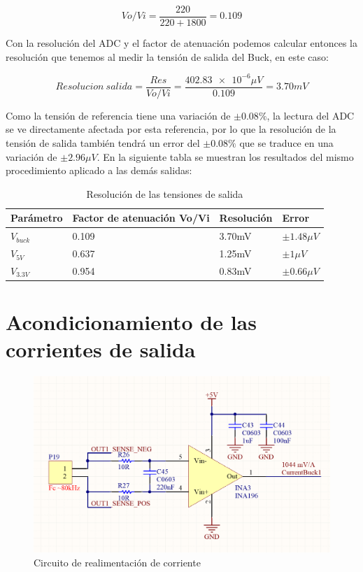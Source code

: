 \documentclass[12pt]{report}
\begin{document}
\begin{equation}
	Vo/Vi = \frac{220}{220 + 1800} = 0.109
\end{equation}

Con la resolución del ADC y el factor de atenuación podemos calcular entonces la resolución que tenemos al medir la tensión de salida del Buck, en este caso:

\begin{equation}
	Resolucion \ salida = \frac{Res}{Vo/Vi} = \frac{\num{402.83e-6} \mu V}{0.109} = 3.70 mV
\end{equation}

Como la tensión de referencia tiene una variación de $\pm0.08\%$, la lectura del ADC se ve directamente afectada por esta referencia, por lo que la resolución de la tensión de salida también tendrá un error del $\pm0.08\%$ que se traduce en una variación de $\pm2.96 \mu V$. En la siguiente tabla se muestran los resultados del mismo procedimiento aplicado a las demás salidas:

\begin{table}[H]
	\centering
	\begin{tabular}{M{2cm}M{5cm}M{3cm}M{3cm}} \toprule
		Parámetro & Factor de atenuación Vo/Vi & Resolución & Error 
		\\ \midrule
		$V_{buck}$ & 0.109 & 3.70mV & $\pm1.48 \mu V$ \\
		$V_{5V}$ & 0.637 & 1.25mV & $\pm1 \mu V$ \\
		$V_{3.3V}$ & 0.954 & 0.83mV & $\pm0.66 \mu V$ \\
		\bottomrule
	\end{tabular}
	\caption{Resolución de las tensiones de salida}
\end{table}

\section{Acondicionamiento de las corrientes de salida}

\begin{figure}[H]
	\centering
	\includegraphics[width=\textwidth,height=\textheight,keepaspectratio]{current_feedback}
	\caption{Circuito de realimentación de corriente}
\end{figure}
\end{document}
